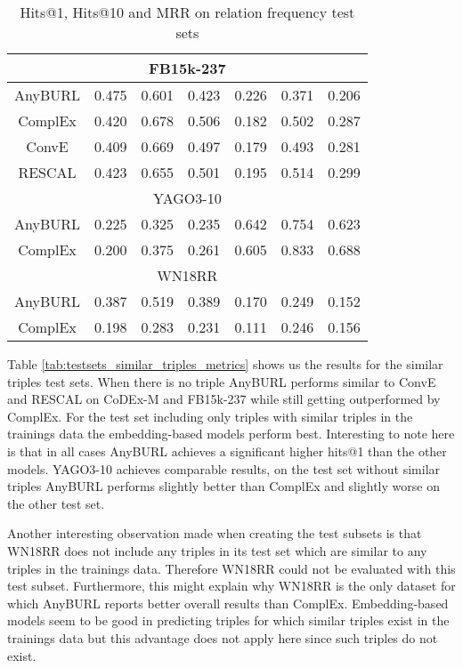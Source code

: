 \begin{table}[H]
\begin{tabular}{crrrrrr|}
\multicolumn{7}{|c|}{FB15k-237} \\ \hline
\multicolumn{1}{c|}{AnyBURL} & 0.475 & 0.601 & \multicolumn{1}{r|}{0.423} & 0.226 & 0.371 & 0.206 \\
\multicolumn{1}{c|}{ComplEx} & 0.420 & 0.678 & \multicolumn{1}{r|}{0.506} & 0.182 & 0.502 & 0.287 \\
\multicolumn{1}{c|}{ConvE} & 0.409 & 0.669 & \multicolumn{1}{r|}{0.497} & 0.179 & 0.493 & 0.281 \\
\multicolumn{1}{c|}{RESCAL} & 0.423 & 0.655 & \multicolumn{1}{r|}{0.501} & 0.195 & 0.514 & 0.299 \\ \hline
\multicolumn{7}{|c|}{YAGO3-10} \\ \hline
\multicolumn{1}{c|}{AnyBURL} & 0.225 & 0.325 &  \multicolumn{1}{r|}{0.235} & 0.642 & 0.754 & 0.623 \\
\multicolumn{1}{c|}{ComplEx} & 0.200 & 0.375 & \multicolumn{1}{r|}{0.261} & 0.605 & 0.833 & 0.688 \\ \hline
\multicolumn{7}{|c|}{WN18RR} \\ \hline
\multicolumn{1}{c|}{AnyBURL} & 0.387 & 0.519 & \multicolumn{1}{r|}{0.389} & 0.170 & 0.249 & 0.152 \\
\multicolumn{1}{c|}{ComplEx} & 0.198 & 0.283 & \multicolumn{1}{r|}{0.231} & 0.111 & 0.246 & 0.156
\end{tabular}
\caption{Hits@1, Hits@10 and MRR on relation frequency test sets}
\label{tab:testsets_relation_freq_metrics}
\end{table}

Table \ref{tab:testsets_similar_triples_metrics} shows us the results for the similar triples test sets. When there is no triple AnyBURL performs similar to ConvE and RESCAL on CoDEx-M and FB15k-237 while still getting outperformed by ComplEx. For the test set including only triples with similar triples in the trainings data the embedding-based models perform best. Interesting to note here is that in all cases AnyBURL achieves a significant higher hits@1 than the other models.
YAGO3-10 achieves comparable results, on the test set without similar triples AnyBURL performs slightly better than ComplEx and slightly worse on the other test set.

Another interesting observation made when creating the test subsets is that WN18RR does not include any triples in its test set which are similar to any triples in the trainings data. Therefore WN18RR could not be evaluated with this test subset. Furthermore, this might explain why WN18RR is the only dataset for which AnyBURL reports better overall results than ComplEx. Embedding-based models seem to be good in predicting triples for which similar triples exist in the trainings data but this advantage does not apply here since such triples do not exist.

